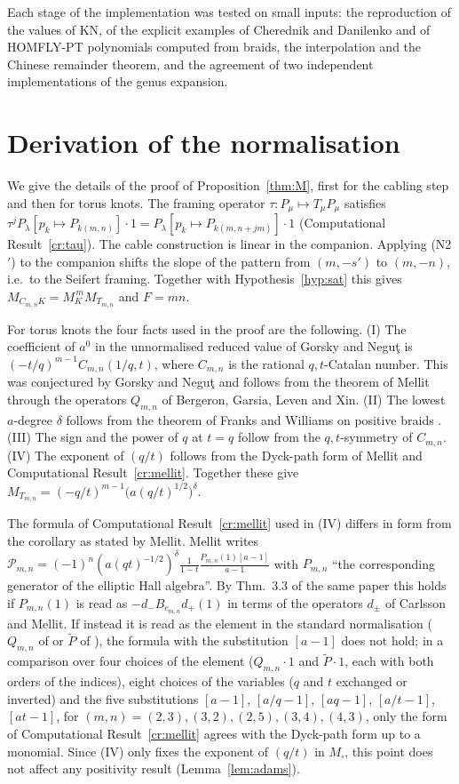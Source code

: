 Each stage of the implementation was tested on small inputs:
the reproduction of the values of KN, of the explicit examples of Cherednik and Danilenko and of HOMFLY-PT polynomials computed from braids,
the interpolation and the Chinese remainder theorem, and the agreement of two independent implementations of the genus expansion.

\section{Derivation of the normalisation}\label{app:normalization}
We give the details of the proof of Proposition~\ref{thm:M}, first for the cabling step and then for torus knots.
The framing operator $\tau:P_\mu\mapsto T_\mu P_\mu$ satisfies $\tau^jP_\lambda[p_k\mapsto P_{k(m,n)}]\cdot1=P_\lambda[p_k\mapsto P_{k(m,n+jm)}]\cdot1$ (Computational Result~\ref{cr:tau}).
The cable construction is linear in the companion. Applying (N2$'$) to the companion shifts the slope of the pattern from $(m,-s')$ to $(m,-n)$, i.e.\ to the Seifert framing.
Together with Hypothesis~\ref{hyp:sat} this gives $M_{C_{m,n}K}=M_K^{\,m}M_{T_{m,n}}$ and $F=mn$.

For torus knots the four facts used in the proof are the following.
(I) The coefficient of $a^0$ in the unnormalised reduced value of Gorsky and Negu\c{t} is $(-t/q)^{m-1}C_{m,n}(1/q,t)$, where $C_{m,n}$ is the rational $q,t$-Catalan number.
This was conjectured by Gorsky and Negu\c{t} and follows from the theorem of Mellit \cite{Mellit16} through the operators $Q_{m,n}$ of Bergeron, Garsia, Leven and Xin.
(II) The lowest $a$-degree $\delta$ follows from the theorem of Franks and Williams on positive braids \cite{Franks87}.
(III) The sign and the power of $q$ at $t=q$ follow from the $q,t$-symmetry of $C_{m,n}$.
(IV) The exponent of $(q/t)$ follows from the Dyck-path form of Mellit \cite{Mellit17} and Computational Result~\ref{cr:mellit}.
Together these give $M_{T_{m,n}}=(-q/t)^{m-1}\bigl(a(q/t)^{1/2}\bigr)^{\delta}$.

The formula of Computational Result~\ref{cr:mellit} used in (IV) differs in form from the corollary as stated by Mellit.
Mellit \cite[Cor.~3.4]{Mellit17} writes $\mathcal{P}_{m,n}=(-1)^n(a(qt)^{-1/2})^\delta\frac{1}{1-t}\frac{P_{m,n}(1)[a-1]}{a-1}$ with $P_{m,n}$ ``the corresponding generator of the elliptic Hall algebra''.
By Thm.~3.3 of the same paper this holds if $P_{m,n}(1)$ is read as $-d_-B_{c_{m,n}}d_+(1)$ in terms of the operators $d_\pm$ of Carlsson and Mellit.
If instead it is read as the element in the standard normalisation ($Q_{m,n}$ of \cite{Bergeron14} or $\widetilde P$ of \cite{Gorsky13b}), the formula with the substitution $[a-1]$ does not hold;
in a comparison over four choices of the element ($Q_{m,n}\cdot1$ and $\widetilde P\cdot1$, each with both orders of the indices), eight choices of the variables
($q$ and $t$ exchanged or inverted) and the five substitutions $[a-1]$, $[a/q-1]$, $[aq-1]$, $[a/t-1]$, $[at-1]$, for $(m,n)=(2,3),(3,2),(2,5),(3,4),(4,3)$,
only the form of Computational Result~\ref{cr:mellit} agrees with the Dyck-path form up to a monomial.
Since (IV) only fixes the exponent of $(q/t)$ in $M_\square$, this point does not affect any positivity result (Lemma~\ref{lem:adams}).

